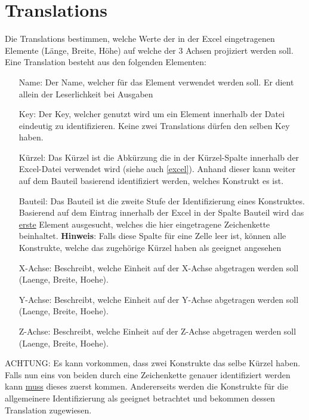 \documentclass{book}
\newcommand{\hinweis}[1]{\newline \textbf{Hinweis}: #1 \newline}
\newcommand{\red}[1]{\color{red}#1\color{black}\xspace}
\begin{document}
		\section{Translations}
			Die Translations bestimmen, welche Werte der in der Excel eingetragenen Elemente (Länge, Breite, Höhe) auf welche der 3 Achsen projiziert werden soll. Eine Translation besteht aus den folgenden Elementen:
			\begin{itemize}
				\setlength{\itemindent}{1cm}
				\item[Name:] Der Name, welcher für das Element verwendet werden soll. Er dient allein der Leserlichkeit bei Ausgaben
				\item[Key:] Der Key, welcher genutzt wird um ein Element innerhalb der Datei eindeutig zu identifizieren. Keine zwei Translations dürfen den selben Key haben.
				\item[Kürzel:] Das Kürzel ist die Abkürzung die in der \glqq Kürzel\grqq -Spalte innerhalb der Excel-Datei verwendet wird (siehe auch \hyperref[excel]{\ref{excel}}). Anhand dieser kann weiter auf dem Bauteil basierend identifiziert werden, welches Konstrukt es ist.
				\item[Bauteil:] Das Bauteil ist die zweite Stufe der Identifizierung eines Konstruktes. Basierend auf dem Eintrag innerhalb der Excel in der Spalte \glqq Bauteil \grqq wird das \underline{erste} Element ausgesucht, welches die hier eingetragene Zeichenkette beinhaltet.
				\hinweis{Falls diese Spalte für eine Zelle leer ist, können alle Konstrukte, welche das zugehörige Kürzel haben als geeignet angesehen}
				\item[X-Achse:] Beschreibt, welche Einheit auf der X-Achse abgetragen werden soll (Laenge, Breite, Hoehe).
				\item[Y-Achse:] Beschreibt, welche Einheit auf der Y-Achse abgetragen werden soll (Laenge, Breite, Hoehe).
				\item[Z-Achse:] Beschreibt, welche Einheit auf der Z-Achse abgetragen werden soll (Laenge, Breite, Hoehe).
			\end{itemize}
		
			\red{ACHTUNG}: Es kann vorkommen, dass zwei Konstrukte das selbe Kürzel haben. Falls nun eins von beiden durch eine Zeichenkette genauer identifiziert werden kann \underline{muss} dieses zuerst kommen. Andererseits werden die Konstrukte für die allgemeinere Identifizierung als geeignet betrachtet und bekommen dessen Translation zugewiesen.\\
			
\end{document}
